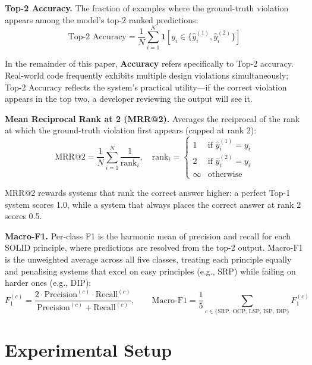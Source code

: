 \documentclass[12pt,a4paper,oneside]{report}
\begin{document}
\textbf{Top-2 Accuracy.} The fraction of examples where the ground-truth violation appears among the model's top-2 ranked predictions:
\begin{equation}
  \text{Top-2 Accuracy} = \frac{1}{N} \sum_{i=1}^{N} \mathbf{1}[y_i \in \{\hat{y}_i^{(1)}, \hat{y}_i^{(2)}\}]
\end{equation}

In the remainder of this paper, \textbf{Accuracy} refers specifically to Top-2 accuracy. Real-world code frequently exhibits multiple design violations simultaneously; Top-2 Accuracy reflects the system's practical utility---if the correct violation appears in the top two, a developer reviewing the output will see it.

\textbf{Mean Reciprocal Rank at 2 (MRR@2).} Averages the reciprocal of the rank at which the ground-truth violation first appears (capped at rank 2):
\begin{equation}
  \text{MRR@2} = \frac{1}{N} \sum_{i=1}^{N} \frac{1}{\text{rank}_i}, \quad \text{rank}_i = \begin{cases} 1 & \text{if } \hat{y}_i^{(1)} = y_i \\ 2 & \text{if } \hat{y}_i^{(2)} = y_i \\ \infty & \text{otherwise} \end{cases}
\end{equation}

MRR@2 rewards systems that rank the correct answer higher: a perfect Top-1 system scores 1.0, while a system that always places the correct answer at rank 2 scores 0.5.

\textbf{Macro-F1.} Per-class F1 is the harmonic mean of precision and recall for each SOLID principle, where predictions are resolved from the top-2 output. Macro-F1 is the unweighted average across all five classes, treating each principle equally and penalising systems that excel on easy principles (e.g., SRP) while failing on harder ones (e.g., DIP):
\begin{equation}
  F_1^{(c)} = \frac{2 \cdot \text{Precision}^{(c)} \cdot \text{Recall}^{(c)}}{\text{Precision}^{(c)} + \text{Recall}^{(c)}}, \qquad
  \text{Macro-F1} = \frac{1}{5} \sum_{c \in \{\text{SRP, OCP, LSP, ISP, DIP}\}} F_1^{(c)}
\end{equation}

\section{Experimental Setup}
\end{document}

